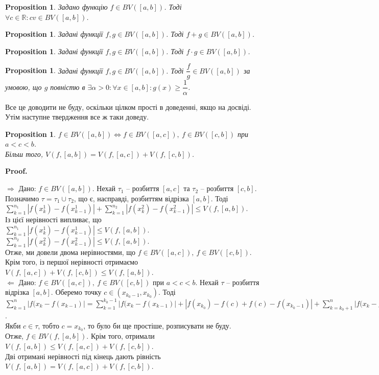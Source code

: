 \documentclass[a4paper, 10pt]{article}
\makeatletter
\def\qed{$\blacksquare$}
\def\rightproof{$\boxed{\Rightarrow}$ }
\def\leftproof{$\boxed{\Leftarrow}$ }
\theoremstyle{theoremdd}
\theoremstyle{theoremdd}
\theoremstyle{theoremdd}
\theoremstyle{theoremdd}
\theoremstyle{theoremdd}
\theoremstyle{theoremdd}
\newtheorem{proposition}[theorem]{Proposition}
\theoremstyle{theoremdd}
\theoremstyle{theoremdd}
\theoremstyle{theoremdd}
\renewenvironment{proof}[1][Proof.\\]{\par
\pushQED{\hfill \qed}%
\normalfont \topsep6\p@\@plus6\p@\relax
\trivlist
\item\relax
{\bfseries
#1\@addpunct{.}}\hspace\labelsep\ignorespaces
}{%
\popQED\endtrivlist\@endpefalse
}
\makeatother
\begin{document}
\begin{proposition}
Задано функцію $f \in BV([a,b])$. Тоді $\forall c \in \mathbb{R}: cv \in BV([a,b])$.
\end{proposition}

\begin{proposition}
Задані функції $f,g \in BV([a,b])$. Тоді $f+g \in BV([a,b])$.
\end{proposition}

\begin{proposition}
Задані функції $f,g \in BV([a,b])$. Тоді $f \cdot g \in BV([a,b])$.
\end{proposition}

\begin{proposition}
Задані функції $f,g \in BV([a,b])$. Тоді $\dfrac{f}{g} \in BV([a,b])$ за умовою, що $g$ повністю в $\exists \alpha > 0: \forall x \in [a,b]: g(x) \geq \dfrac{1}{\alpha}$.
\end{proposition}
\noindent
Все це доводити не буду, оскільки цілком прості в доведенні, якщо на досвіді. Утім наступне твердження все ж таки доведу.

\begin{proposition}
$f \in BV([a,b]) \iff f \in BV([a,c]),\ f \in BV([c,b])$ при $a < c < b$. \\
Більш того, $V(f,[a,b]) = V(f,[a,c]) + V(f,[c,b])$.
\end{proposition}

\begin{proof}
\rightproof Дано: $f \in BV([a,b])$. Нехай $\tau_1$ -- розбиття $[a,c]$ та $\tau_2$ -- розбиття $[c,b]$. Позначимо $\tau = \tau_1 \cup \tau_2$, що є, насправді, розбиттям відрізка $[a,b]$. Тоді\\
$\displaystyle\sum_{k=1}^{n_1} |f(x_{k}^1) - f(x_{k-1}^1)| + \sum_{k=1}^{n_2} |f(x_k^2) - f(x_{k-1}^2)| \leq V(f,[a,b])$.\\
Із цієї нерівності випливає, що\\
$\displaystyle\sum_{k=1}^{n_1} |f(x_{k}^1) - f(x_{k-1}^1)| \leq V(f,[a,b])$.\\
$\displaystyle\sum_{k=1}^{n_2} |f(x_{k}^2) - f(x_{k-1}^2)| \leq V(f,[a,b])$.\\
Отже, ми довели двома нерівностями, що $f \in BV([a,c]),\ f \in BV([c,b])$. Крім того, із першої нерівності отримаємо $V(f,[a,c]) + V(f,[c,b]) \leq V(f,[a,b])$.
\bigskip \\
\leftproof Дано: $f \in BV([a,c]),\ f \in BV([c,b])$ при $a < c < b$. Нехай $\tau$ -- розбиття відрізка $[a,b]$. Оберемо точку $c \in (x_{k_0-1},x_{k_0})$. Тоді\\
$\displaystyle\sum_{k=1}^n |f(x_{k} - f(x_{k-1})| = \sum_{k=1}^{k_0-1} |f(x_{k} - f(x_{k-1})| + |f(x_{k_0}) - f(c) + f(c) - f(x_{k_0-1})| + \sum_{k=k_0+1}^n |f(x_{k} - f(x_{k-1})| \leq V(f,[a,c]) + V(f,[c,b])$.\\
Якби $c \in \tau$, тобто $c = x_{k_0}$, то було би ще простіше, розписувати не буду.\\
Отже, $f \in BV(f,[a,b])$. Крім того, отримали $V(f,[a,b]) \leq V(f,[a,c]) + V(f,[c,b])$.
\bigskip \\
Дві отримані нерівності під кінець дають рівність $V(f,[a,b]) = V(f,[a,c]) + V(f,[c,b])$.
\end{proof}
\end{document}
